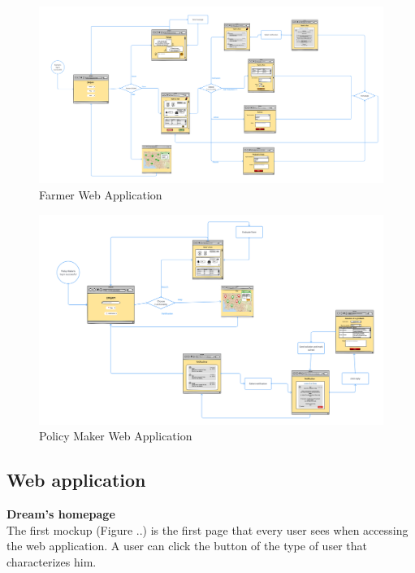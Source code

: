 \begin{figure}[H]
    \begin{center}
          \includegraphics[width=1\textwidth]{images/UXdiagram_farmer.png}
          \caption{Farmer Web Application}
    \end{center}
\end{figure}
\begin{figure}[H]
    \begin{center}
          \includegraphics[width=1\textwidth]{images/UXdiagram_policymaker.png}
          \caption{Policy Maker Web Application}
    \end{center}
\end{figure}

\subsection{Web application}
\textbf{Dream's homepage} \\
The first mockup (Figure ..) is the first page that every user sees when accessing the web application. 
A user can click the button of the type of user that characterizes him.

